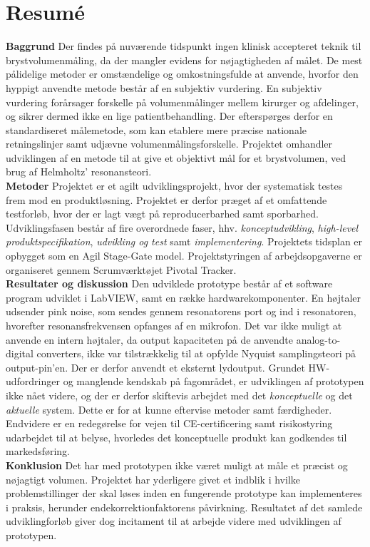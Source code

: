 \section{Resumé}

\textbf{Baggrund} Der findes på nuværende tidspunkt ingen klinisk accepteret teknik til brystvolumenmåling, da der mangler evidens for nøjagtigheden af målet. De mest pålidelige metoder er omstændelige og omkostningsfulde at anvende, hvorfor den hyppigt anvendte metode består af en subjektiv vurdering. En subjektiv vurdering forårsager forskelle på volumenmålinger mellem kirurger og afdelinger, og sikrer dermed ikke en lige patientbehandling. Der efterspørges derfor en standardiseret målemetode, som kan etablere mere præcise nationale retningslinjer samt udjævne volumenmålingsforskelle. Projektet omhandler udviklingen af en metode til at give et objektivt mål for et brystvolumen, ved brug af Helmholtz' resonansteori. \\
\textbf{Metoder} Projektet er et agilt udviklingsprojekt, hvor der systematisk testes frem mod en produktløsning. Projektet er derfor præget af et omfattende testforløb, hvor der er lagt vægt på reproducerbarhed samt sporbarhed. 
Udviklingsfasen består af fire overordnede faser, hhv. \textit{konceptudvikling}, \textit{high-level produktspecifikation}, \textit{udvikling og test} samt \textit{implementering}.
Projektets tidsplan er opbygget som en Agil Stage-Gate model. Projektstyringen af arbejdsopgaverne er organiseret gennem Scrumværktøjet Pivotal Tracker.\\
\textbf{Resultater og diskussion} Den udviklede prototype består af et software program udviklet i LabVIEW, samt en række hardwarekomponenter. En højtaler udsender pink noise, som sendes gennem resonatorens port og ind i resonatoren, hvorefter resonansfrekvensen opfanges af en mikrofon. Det var ikke muligt at anvende en intern højtaler, da output kapaciteten på de anvendte analog-to-digital converters, ikke var tilstrækkelig til at opfylde Nyquist samplingsteori på output-pin'en. Der er derfor anvendt et eksternt lydoutput. Grundet HW-udfordringer og manglende kendskab på fagområdet, er udviklingen af prototypen ikke nået videre, og der er derfor skiftevis arbejdet med det \textit{konceptuelle} og det \textit{aktuelle} system. Dette er for at kunne eftervise metoder samt færdigheder. 
Endvidere er en redegørelse for vejen til CE-certificering samt risikostyring udarbejdet til at belyse, hvorledes det konceptuelle produkt kan godkendes til markedsføring.\\
\textbf{Konklusion} Det har med prototypen ikke været muligt at måle et præcist og nøjagtigt volumen. Projektet har yderligere givet et indblik i hvilke problemstillinger der skal løses inden en fungerende prototype kan implementeres i praksis, herunder endekorrektionfaktorens påvirkning. Resultatet af det samlede udviklingforløb giver dog incitament til at arbejde videre med udviklingen af prototypen.   